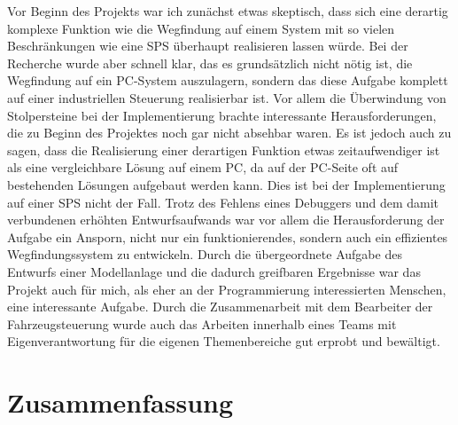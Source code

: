 	Vor Beginn des Projekts war ich zunächst etwas skeptisch, dass sich eine derartig komplexe Funktion wie die Wegfindung auf einem System mit so vielen Beschränkungen wie eine \ac{SPS} überhaupt realisieren lassen würde. Bei der Recherche wurde aber schnell klar, das es grundsätzlich nicht nötig ist, die Wegfindung auf ein PC-System auszulagern, sondern das diese Aufgabe komplett auf einer industriellen Steuerung realisierbar ist. Vor allem die Überwindung von Stolpersteine bei der Implementierung brachte interessante Herausforderungen, die zu Beginn des Projektes noch gar nicht absehbar waren. Es ist jedoch auch zu sagen, dass die Realisierung einer derartigen Funktion etwas zeitaufwendiger ist als eine vergleichbare Lösung auf einem PC, da auf der PC-Seite oft auf bestehenden Lösungen aufgebaut werden kann. Dies ist bei der Implementierung auf einer \ac{SPS} nicht der Fall. Trotz des Fehlens eines Debuggers und dem damit verbundenen erhöhten Entwurfsaufwands war vor allem die Herausforderung der Aufgabe ein Ansporn, nicht nur ein funktionierendes, sondern auch ein effizientes Wegfindungssystem zu entwickeln. Durch die übergeordnete Aufgabe des Entwurfs einer Modellanlage und die dadurch greifbaren Ergebnisse war das Projekt auch für mich, als eher an der Programmierung interessierten Menschen, eine interessante Aufgabe. Durch die Zusammenarbeit mit dem Bearbeiter der Fahrzeugsteuerung wurde auch das Arbeiten innerhalb eines Teams mit Eigenverantwortung für die eigenen Themenbereiche gut erprobt und bewältigt.

\section{Zusammenfassung}
	
